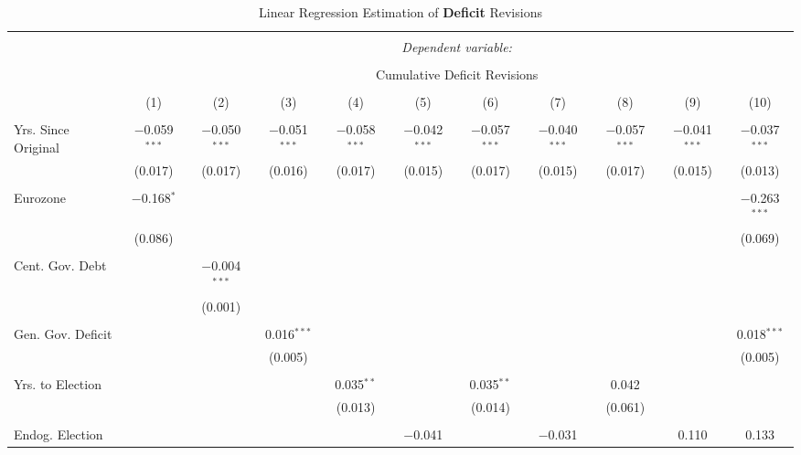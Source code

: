
\begin{table}[!htbp] \centering 
  \caption{Linear Regression Estimation of \textbf{Deficit} Revisions} 
  \label{deficit_results} 
\tiny 
\begin{tabular}{@{\extracolsep{5pt}}lcccccccccc} 
\\[-1.8ex]\hline 
\hline \\[-1.8ex] 
 & \multicolumn{10}{c}{\textit{Dependent variable:}} \\ 
\cline{2-11} 
\\[-1.8ex] & \multicolumn{10}{c}{Cumulative Deficit Revisions} \\ 
\\[-1.8ex] & (1) & (2) & (3) & (4) & (5) & (6) & (7) & (8) & (9) & (10)\\ 
\hline \\[-1.8ex] 
 Yrs. Since Original & $-$0.059$^{***}$ & $-$0.050$^{***}$ & $-$0.051$^{***}$ & $-$0.058$^{***}$ & $-$0.042$^{***}$ & $-$0.057$^{***}$ & $-$0.040$^{***}$ & $-$0.057$^{***}$ & $-$0.041$^{***}$ & $-$0.037$^{***}$ \\ 
  & (0.017) & (0.017) & (0.016) & (0.017) & (0.015) & (0.017) & (0.015) & (0.017) & (0.015) & (0.013) \\ 
  & & & & & & & & & & \\ 
 Eurozone & $-$0.168$^{*}$ &  &  &  &  &  &  &  &  & $-$0.263$^{***}$ \\ 
  & (0.086) &  &  &  &  &  &  &  &  & (0.069) \\ 
  & & & & & & & & & & \\ 
 Cent. Gov. Debt &  & $-$0.004$^{***}$ &  &  &  &  &  &  &  &  \\ 
  &  & (0.001) &  &  &  &  &  &  &  &  \\ 
  & & & & & & & & & & \\ 
 Gen. Gov. Deficit &  &  & 0.016$^{***}$ &  &  &  &  &  &  & 0.018$^{***}$ \\ 
  &  &  & (0.005) &  &  &  &  &  &  & (0.005) \\ 
  & & & & & & & & & & \\ 
 Yrs. to Election &  &  &  & 0.035$^{**}$ &  & 0.035$^{**}$ &  & 0.042 &  &  \\ 
  &  &  &  & (0.013) &  & (0.014) &  & (0.061) &  &  \\ 
  & & & & & & & & & & \\ 
 Endog. Election &  &  &  &  & $-$0.041 &  & $-$0.031 &  & 0.110 & 0.133 \\ 

\end{tabular}
\end{table}
